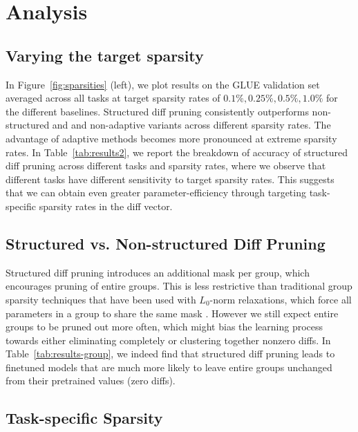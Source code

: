 \section{Analysis}

\subsection{Varying the target sparsity}

\label{sec:sparsity}

In Figure~\ref{fig:sparsities} (left), we plot results on the GLUE validation set averaged across all tasks at target sparsity rates of $0.1\%, 0.25\%, 0.5\%, 1.0\%$ for the different baselines. Structured diff pruning consistently outperforms non-structured and and non-adaptive variants across different sparsity rates. The advantage of adaptive methods becomes more pronounced at extreme sparsity rates. In Table~\ref{tab:results2}, we report the breakdown of accuracy of structured diff pruning across different tasks and sparsity rates, where we observe that different tasks have different sensitivity to target sparsity rates. This suggests that we can obtain even greater parameter-efficiency through targeting task-specific sparsity rates in the diff vector.

\subsection{Structured vs. Non-structured Diff Pruning}

Structured diff pruning introduces an additional mask per group, which encourages pruning of entire groups. This is less restrictive than traditional group sparsity techniques that have been used with $L_0$-norm relaxations, which force all parameters in a group to share the same mask \citep{louizos2018sparse,wang2019structuredpruning}. However we   still expect entire groups to be pruned out more often, which might bias the learning process towards either eliminating completely or clustering together nonzero diffs. In Table~\ref{tab:results-group}, we indeed find that structured diff pruning leads to finetuned models that are much more likely to leave entire groups unchanged from their pretrained values (zero diffs).

\subsection{Task-specific Sparsity}

